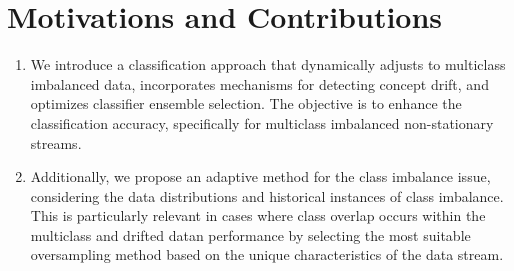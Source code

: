   \section{Motivations and Contributions} \label{sec:4_2_motivation}
  \begin{enumerate}[nosep]
    \item We introduce a classification approach that dynamically adjusts to multiclass imbalanced data, incorporates mechanisms for
    detecting concept drift, and optimizes classifier ensemble selection. The objective is to enhance the classification accuracy, specifically for multiclass imbalanced non-stationary streams.
   \item Additionally, we propose an adaptive method for the class imbalance issue, considering the data distributions and historical instances of class imbalance. This is particularly relevant in cases where class overlap occurs within the multiclass and drifted datan performance by selecting the most suitable oversampling method based on the unique characteristics of the data stream. 
    \end{enumerate}